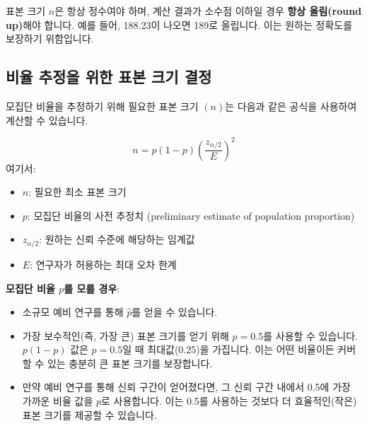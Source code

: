 \documentclass[11pt,a4paper]{article}
\begin{document}
\begin{enumerate}
\begin{enumerate}
\begin{cautionbox}
    표본 크기 \(n\)은 항상 정수여야 하며, 계산 결과가 소수점 이하일 경우 \textbf{항상 올림(round up)}해야 합니다. 예를 들어, 188.23이 나오면 189로 올립니다. 이는 원하는 정확도를 보장하기 위함입니다.
\end{cautionbox}

\subsection*{비율 추정을 위한 표본 크기 결정}
모집단 비율을 추정하기 위해 필요한 표본 크기 \((n)\)는 다음과 같은 공식을 사용하여 계산할 수 있습니다.

\begin{equation*}
    n = p(1-p) \left( \frac{z_{\alpha/2}}{E} \right)^2
\end{equation*}
여기서:
\begin{itemize}
    \item \(n\): 필요한 최소 표본 크기
    \item \(p\): 모집단 비율의 사전 추정치 (preliminary estimate of population proportion)
    \item \(z_{\alpha/2}\): 원하는 신뢰 수준에 해당하는 임계값
    \item \(E\): 연구자가 허용하는 최대 오차 한계
\end{itemize}

\begin{tipbox}
    \textbf{모집단 비율 \(p\)를 모를 경우}:
    \begin{itemize}
        \item 소규모 예비 연구를 통해 \(\hat{p}\)를 얻을 수 있습니다.
        \item 가장 보수적인(즉, 가장 큰) 표본 크기를 얻기 위해 \(p = 0.5\)를 사용할 수 있습니다. \(p(1-p)\) 값은 \(p=0.5\)일 때 최대값(0.25)을 가집니다. 이는 어떤 비율이든 커버할 수 있는 충분히 큰 표본 크기를 보장합니다.
        \item 만약 예비 연구를 통해 신뢰 구간이 얻어졌다면, 그 신뢰 구간 내에서 0.5에 가장 가까운 비율 값을 \(p\)로 사용합니다. 이는 0.5를 사용하는 것보다 더 효율적인(작은) 표본 크기를 제공할 수 있습니다.
    \end{itemize}
\end{tipbox}


\end{enumerate}
\end{enumerate}
\end{document}
